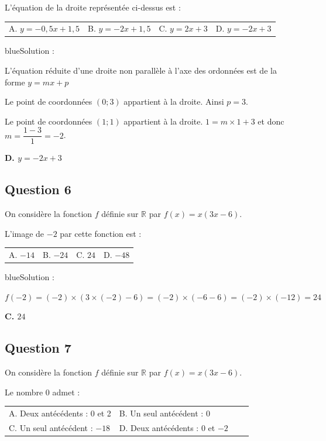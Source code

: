 \documentclass[10pt]{article}
\begin{document}
L'équation de la droite représentée ci-dessus est :
\begin{center}
\begin{tabularx}{.92\linewidth}{XXXX} A. $y=-0,5x+1,5$ & B. $y=-2x+1,5$ & C. $y=2x+3$ & D. $y=-2x+3$\end{tabularx}
\end{center}

\begin{color}{blue}Solution :\par
L'équation réduite d'une droite non parallèle à l'axe des ordonnées est de la forme $y=mx+p$

Le point de coordonnées $(0;3)$ appartient à la droite. Ainsi $p=3$.

Le point de coordonnées $(1;1)$ appartient à la droite. $1 = m\times 1 + 3$ et donc $m=\dfrac{1-3}{1} = -2$.

\textbf{D. $y=-2x+3$}
\end{color}

\subsection*{Question 6}

On considère la fonction $f$ définie sur $\mathbb{R}$ par $f(x)=x(3x-6)$.\par
L'image de $-2$ par cette fonction est :
\begin{center}
\begin{tabularx}{.92\linewidth}{XXXX} A. $-14$ & B. $-24$ & C. $24$ & D. $-48$\end{tabularx}
\end{center}

\begin{color}{blue}Solution :\par
$f(-2)=(-2)\times(3\times(-2)-6) = (-2)\times(-6-6) =(-2)\times(-12) = 24 $

\textbf{C. $24$}
\end{color}

\subsection*{Question 7}

On considère la fonction $f$ définie sur $\mathbb{R}$ par $f(x)=x(3x-6)$.\par
Le nombre 0 admet :
\begin{center}
\begin{tabularx}{.92\linewidth}{XXXX} A. Deux antécédents : 0 et 2 & B. Un seul antécédent : 0 \\ C. Un seul antécédent : $-18$ & D. Deux antécédents : 0 et $-2$\end{tabularx}
\end{center}
\end{document}
